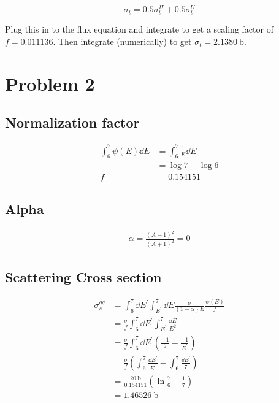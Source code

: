 \documentclass{article}
\begin{document}
\[
	\sigma_t = 0.5 \sigma_t^H + 0.5 \sigma_t^U
\]

Plug this in to the flux equation and integrate to get a scaling factor of $f=0.011136$. Then integrate (numerically) to get $\sigma_t = \SI{2.1380}{\barn}$.

\pagebreak
\section{Problem 2}

\subsection{Normalization factor}

\begin{align*}
\int_6^7 \psi(E) \dd{E} &= \int_6^7 \frac{1}{E} \dd{E} \\
&= \log{7} - \log{6} \\
f &= 0.154151
\end{align*}

\subsection{Alpha}

\begin{align*}
\alpha = \frac{(A-1)^2}{(A+1)^2} = 0
\end{align*}

\subsection{Scattering Cross section}

\begin{align*}
\sigma_s^{gg} &= \int_6^7 \dd{E^\prime} \int_{E^\prime}^7 \dd{E} \frac{\sigma}{(1 - \alpha)E} \frac{\psi(E)}{f} \\
&= \frac{\sigma}{f} \int_6^7 \dd{E^\prime} \int_{E^\prime}^7 \frac{\dd{E}}{E^2} \\
&= \frac{\sigma}{f} \int_6^7 \dd{E^\prime} \left( \frac{-1}{7} - \frac{-1}{{E^\prime}} \right) \\
&= \frac{\sigma}{f} \left( \int_6^7 \frac{\dd{E^\prime}}{{E^\prime}} - \int_6^7 \frac{\dd{E^\prime}}{7} \right) \\
&= \frac{\SI{20}{\barn}}{0.154151} \left( \ln \frac{7}{6} - \frac{1}{7} \right) \\
&= \SI{1.46526}{\barn}
\end{align*}

\pagebreak
\end{document}
